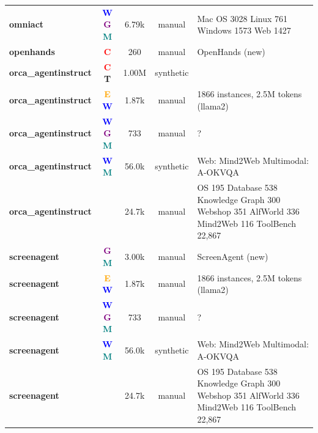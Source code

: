 \begin{table}[t]
\begin{tabular*}{\textwidth}{@{\extracolsep{\fill}}l c c c p{5cm}}
        \textbf{omniact \cite{omniact_a_dataset_an_2402_17553}} & \textcolor{blue}{\textbf{W}} \textcolor{purple}{\textbf{G}} \textcolor{teal}{\textbf{M}} & 6.79k & manual & Mac OS 3028
Linux 761
Windows 1573
Web 1427 \\
        \textbf{openhands} & \textcolor{red}{\textbf{C}} & 260 & manual & OpenHands (new) \\
        \textbf{orca\_agentinstruct \cite{agentinstruct_toward_2407_03502}} & \textcolor{red}{\textbf{C}} \textcolor{green!60!black}{\textbf{T}} & 1.00M & synthetic &  \\
        \textbf{orca\_agentinstruct \cite{agenttuning_enabling_2310_12823}} & \textcolor{orange}{\textbf{E}} \textcolor{blue}{\textbf{W}} & 1.87k & manual & 1866 instances, 2.5M tokens (llama2) \\
        \textbf{orca\_agentinstruct \cite{webvoyager_building__2401_13919}} & \textcolor{blue}{\textbf{W}} \textcolor{purple}{\textbf{G}} \textcolor{teal}{\textbf{M}} & 733 & manual & ? \\
        \textbf{orca\_agentinstruct \cite{agent_lumos_unified__2311_05657}} & \textcolor{blue}{\textbf{W}} \textcolor{teal}{\textbf{M}} & 56.0k & synthetic & Web: Mind2Web
Multimodal: A-OKVQA \\
        \textbf{orca\_agentinstruct \cite{agent_flan_designing_2403_12881}} &  & 24.7k & manual & OS 195
Database 538
Knowledge Graph 300
Webshop 351
AlfWorld 336
Mind2Web 116
ToolBench 22,867 \\
        \textbf{screenagent \cite{screenagent_a_vision_2402_07945}} & \textcolor{purple}{\textbf{G}} \textcolor{teal}{\textbf{M}} & 3.00k & manual & ScreenAgent (new) \\
        \textbf{screenagent \cite{agenttuning_enabling_2310_12823}} & \textcolor{orange}{\textbf{E}} \textcolor{blue}{\textbf{W}} & 1.87k & manual & 1866 instances, 2.5M tokens (llama2) \\
        \textbf{screenagent \cite{webvoyager_building__2401_13919}} & \textcolor{blue}{\textbf{W}} \textcolor{purple}{\textbf{G}} \textcolor{teal}{\textbf{M}} & 733 & manual & ? \\
        \textbf{screenagent \cite{agent_lumos_unified__2311_05657}} & \textcolor{blue}{\textbf{W}} \textcolor{teal}{\textbf{M}} & 56.0k & synthetic & Web: Mind2Web
Multimodal: A-OKVQA \\
        \textbf{screenagent \cite{agent_flan_designing_2403_12881}} &  & 24.7k & manual & OS 195
Database 538
Knowledge Graph 300
Webshop 351
AlfWorld 336
Mind2Web 116
ToolBench 22,867 \\

\end{tabular*}
\end{table}
